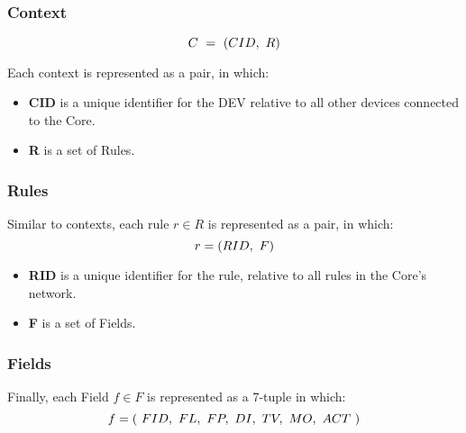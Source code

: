 \documentclass[cspaper]{IEEEtran}
\numberwithin{equation}{subsection}
\begin{document}
	\vspace{1em}
	\subsubsection{Context}
	
	\begin{equation}\notag
		C \ = \ (CID, \ R)
	\end{equation}

	Each context is represented as a pair, in which:
	\begin{itemize}
		\item \textbf{CID} is a unique identifier for the DEV relative to all other devices connected to the Core. 
		\item \textbf{R} is a set of Rules.
	\end{itemize} 

	\vspace{1em}
	\subsubsection{Rules}
	
	\par{
	Similar to contexts, each rule $r \in R$ is represented as a pair, in which:
	}
	\begin{equation}\notag
		r = (RID, \ F)	
	\end{equation}
	\begin{itemize}
		\item \textbf{RID} is a unique identifier for the rule, relative to all rules in the Core's network.
		\item \textbf{F} is a set of Fields.
	\end{itemize}

	\vspace{1em}
	\subsubsection{Fields}
	Finally, each Field $f \in F$ is represented as a 7-tuple in which:
	\begin{equation}\notag	
		f = (\ FID, \ FL, \ FP, \ DI, \ TV, \ MO, \ ACT \ )
	\end{equation}
\end{document}
